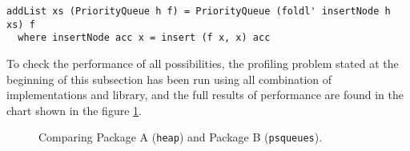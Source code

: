 \begin{lstlisting}[style=haskell, caption= \texttt{addList} using
  \texttt{fold'}, label=addlist:fold]
addList xs (PriorityQueue h f) = PriorityQueue (foldl' insertNode h xs) f
  where insertNode acc x = insert (f x, x) acc
\end{lstlisting}

To check the performance of all possibilities, the profiling problem stated at
the beginning of this subsection has been run using all combination of
implementations and library, and the full results of performance are found in
the chart shown in the figure \ref{chart-libraries}.\\

\begin{figure}[!htbp]
  \centering
{}
\vspace{-1cm}
\caption{Comparing Package A (\texttt{heap}) and Package B
  (\texttt{psqueues}).}
\label{chart-libraries}
\end{figure}


\newpage


